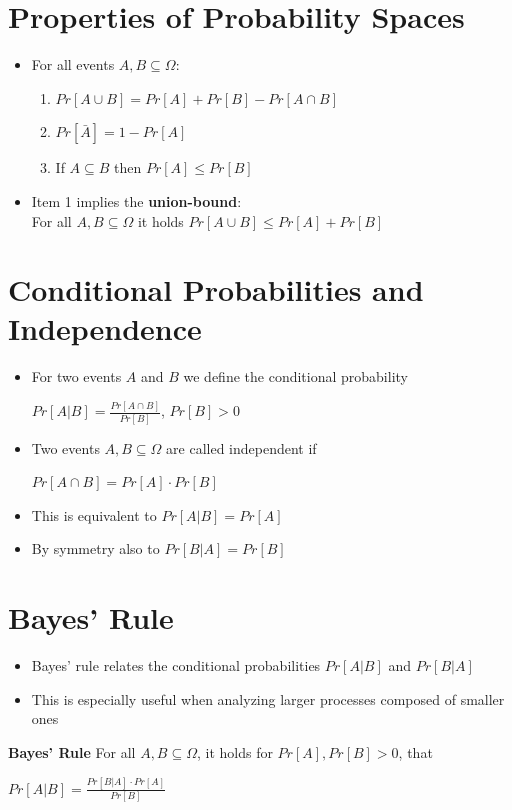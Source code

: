 	\section{Properties of Probability Spaces}
		\begin{itemize}
			\item For all events $A,B \subseteq \Omega$:
				\begin{enumerate}
					\item $Pr[A \cup B] = Pr[A] + Pr[B] - Pr[A \cap B]$
					\item $Pr[\bar{A}] = 1 - Pr[A]$
					\item If $A \subseteq B$ then $Pr[A] \leq Pr[B]$
				\end{enumerate}
			\item Item 1 implies the \textbf{union-bound}:\\
			For all $A,B \subseteq \Omega$ it holds $Pr[A \cup B] \leq Pr[A] + Pr[B]$
		\end{itemize}
	
	\section{Conditional Probabilities and Independence}
		\begin{itemize}
			\item For two events $A$ and $B$ we define the conditional probability 
			\begin{center}
				$Pr[A|B] = \frac{Pr[A \cap B]}{Pr[B]}$, $Pr[B] > 0$
			\end{center}
			\item Two events $A,B \subseteq \Omega$ are called independent if
			\begin{center}
				$Pr[A \cap B] = Pr[A] \cdot Pr[B]$
			\end{center}
			\item This is equivalent to $Pr[A|B] = Pr[A]$
			\item By symmetry also to $Pr[B|A] = Pr[B]$
		\end{itemize}

	\section{Bayes' Rule}
		\begin{itemize}
			\item Bayes’ rule relates the conditional probabilities $Pr[A|B]$ and $Pr[B|A]$
			\item This is especially useful when analyzing larger processes composed of smaller ones
		\end{itemize}
		\textbf{Bayes' Rule}\newline
		For all $A,B \subseteq \Omega$, it holds for $Pr[A],Pr[B] > 0$, that
		\begin{center}
			$Pr[A|B] = \frac{Pr[B|A] \cdot Pr[A]}{Pr[B]}$
		\end{center}
		
